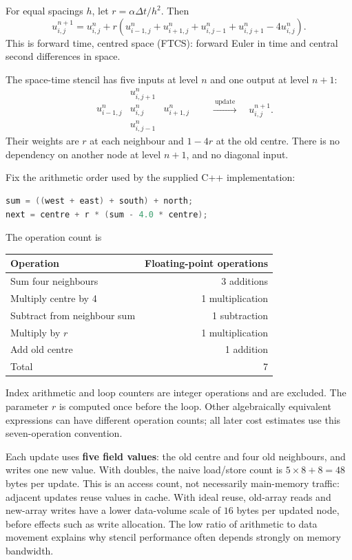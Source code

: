For equal spacings $h$, let $r=\alpha\Delta t/h^2$. Then
\[
\boxed{u_{i,j}^{n+1}=u_{i,j}^n+r\left(
u_{i-1,j}^n+u_{i+1,j}^n+u_{i,j-1}^n+u_{i,j+1}^n-4u_{i,j}^n\right).}
\]
This is forward time, centred space (FTCS): forward Euler in time and central second
differences in space.

The space-time stencil has five inputs at level $n$ and one output at level $n+1$:
\[
\begin{array}{ccccc}
&&u^n_{i,j+1}&&\\[2pt]
&u^n_{i-1,j}&u^n_{i,j}&u^n_{i+1,j}&\\[2pt]
&&u^n_{i,j-1}&&
\end{array}
\quad\xrightarrow{\ \text{update}\ }\quad u^{n+1}_{i,j}.
\]
Their weights are $r$ at each neighbour and $1-4r$ at the old centre. There is no dependency
on another node at level $n+1$, and no diagonal input.

Fix the arithmetic order used by the supplied C++ implementation:
\begin{lstlisting}[language=C++]
sum = ((west + east) + south) + north;
next = centre + r * (sum - 4.0 * centre);
\end{lstlisting}
The operation count is
\begin{center}
\begin{tabular}{lr}
\toprule
Operation & Floating-point operations\\
\midrule
Sum four neighbours & 3 additions\\
Multiply centre by 4 & 1 multiplication\\
Subtract from neighbour sum & 1 subtraction\\
Multiply by $r$ & 1 multiplication\\
Add old centre & 1 addition\\
\midrule
Total & 7\\
\bottomrule
\end{tabular}
\end{center}
Index arithmetic and loop counters are integer operations and are excluded.
The parameter $r$ is computed once before the loop. Other algebraically equivalent expressions
can have different operation counts; all later cost estimates use this seven-operation convention.

Each update uses \textbf{five field values}: the old centre and four old neighbours, and writes
one new value. With doubles, the naive load/store count is $5\times8+8=48$ bytes per update.
This is an access count, not necessarily main-memory traffic: adjacent updates reuse values in
cache. With ideal reuse, old-array reads and new-array writes have a lower data-volume scale
of $16$ bytes per updated node, before effects such as write allocation. The low ratio of
arithmetic to data movement explains why stencil performance often depends strongly on memory bandwidth.

